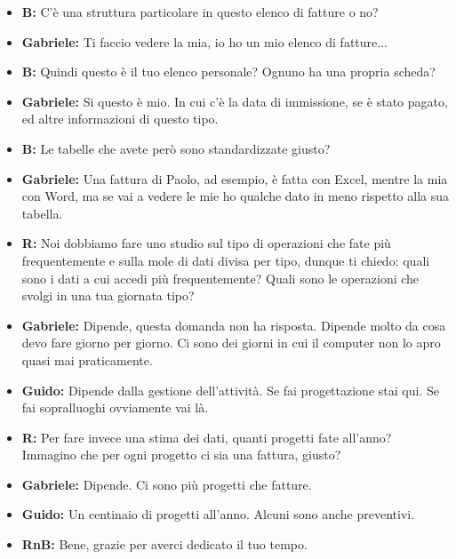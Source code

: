 \documentclass{elegantbook}
\begin{document}
	\begin{itemize}
		\item\textbf{B}\textbf{:} C'è una struttura particolare in questo elenco di fatture o no?
		\item\textbf{Gabriele}\textbf{:} Ti faccio vedere la mia, io ho un mio elenco di fatture...
		\item\textbf{B}\textbf{:} Quindi questo è il tuo elenco personale? Ognuno ha una propria scheda?
		\item\textbf{Gabriele}\textbf{:} Si questo è mio. In cui c'è la data di immissione, se è stato pagato, ed altre informazioni di questo tipo.
		\item\textbf{B}\textbf{:} Le tabelle che avete però sono standardizzate giusto?
		\item\textbf{Gabriele}\textbf{:} Una fattura di Paolo, ad esempio, è fatta con Excel, mentre la mia con Word, ma se vai a vedere le mie ho qualche dato in
                    meno rispetto alla sua tabella.
		\item\textbf{R}\textbf{:} Noi dobbiamo fare uno studio sul tipo di operazioni che fate più frequentemente e sulla mole di dati divisa per tipo, dunque ti
                    chiedo: quali sono i dati a cui accedi più frequentemente? Quali sono le operazioni che svolgi in una tua giornata tipo?
		\item\textbf{Gabriele}\textbf{:} Dipende, questa domanda non ha risposta. Dipende molto da cosa devo fare giorno per giorno. Ci sono dei giorni in cui il
                    computer non lo apro quasi mai praticamente.
		\item\textbf{Guido}\textbf{:} Dipende dalla gestione dell'attività. Se fai progettazione stai qui. Se fai sopralluoghi ovviamente vai là.
		\item\textbf{R}\textbf{:} Per fare invece una stima dei dati, quanti progetti fate all'anno? Immagino che per ogni progetto ci sia una fattura, giusto?
		\item\textbf{Gabriele}\textbf{:} Dipende. Ci sono più progetti che fatture.
		\item\textbf{Guido}\textbf{:} Un centinaio di progetti all'anno. Alcuni sono anche preventivi.
		\item\textbf{RnB}\textbf{:} Bene, grazie per averci dedicato il tuo tempo.
	\end{itemize}
	\newpage
\end{document}
